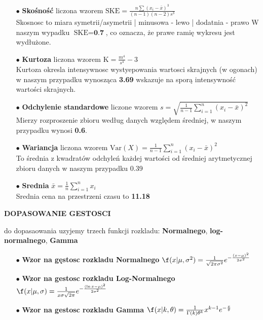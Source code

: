 \documentclass{article}
\begin{document}
\begin{itemize}
    \item[$\bullet$] \textbf{Skośność} liczona wzorem $\text{SKE} = \frac{n \sum (x_i - \bar{x})^3}{(n - 1)(n - 2)s^3}$\\
    Skosnosc to miara symetrii/asymetrii | minusowa - lewo | dodatnia - prawo
    W naszym wypadku $\text{SKE} = \textbf{0.7}$, co oznacza, że prawe ramię wykresu jest wydłużone.
    
    \item[$\bullet$] \textbf{Kurtoza} liczona wzorem $\text{K} = \frac{m^4}{s^4} - 3$\\
    Kurtoza okresla intensywnosc wystyepowania wartosci skrajnych (w ogonach)
    w naszym przypadku wynosząca \textbf{3.69} wskazuje na sporą intensywność wartości skrajnych.
    
    \item[$\bullet$] \textbf{Odchylenie standardowe} liczone wzorem $s = \sqrt{\frac{1}{n-1} \sum_{i=1}^{n} (x_i - \bar{x})^2}$\\
    Mierzy rozproszenie zbioru według danych względem średniej, w naszym przypadku wynosi \textbf{0.6}.
    
    \item[$\bullet$] \textbf{Wariancja} liczona wzorem $\text{Var}(X) = \frac{1}{n-1} \sum_{i=1}^{n} (x_i - \bar{x})^2$\\
    To średnia z kwadratów odchyleń każdej wartości od średniej arytmetycznej zbioru danych w naszym przypadku 0.39

    \item[$\bullet$] \textbf{Srednia} $\bar{x} = \frac{1}{n} \sum_{i=1}^{n} x_i$\\
    Srednia cena na przestrzeni czasu to \textbf{11.18}

\end{itemize}

\hrulefill

\textbf{DOPASOWANIE GESTOSCI}

\Do do dopasaowania uzyjemy trzech funkcji rozkladu: \textbf{Normalnego}, \textbf{log-normalnego}, \textbf{Gamma}

\begin{itemize}
    \item[$\bullet$] \textbf{Wzor na gęstosc rozkladu Normalnego} $\f(x|\mu,\sigma^2) = \frac{1}{\sqrt{2\pi\sigma^2}} e^{-\frac{(x-\mu)^2}{2\sigma^2}}$

    \item[$\bullet$] \textbf{Wzor na gestosc rozkladu Log-Normalnego} $\f(x|\mu,\sigma) = \frac{1}{x\sigma\sqrt{2\pi}} e^{-\frac{(\ln x - \mu)^2}{2\sigma^2}}$

    \item[$\bullet$] \textbf{Wzor na gestosc rozkladu Gamma} $\f(x|k,\theta) = \frac{1}{\Gamma(k)\theta^k} x^{k-1} e^{-\frac{x}{\theta}}$
\end{itemize}
\end{document}
